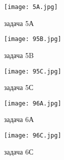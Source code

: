 \documentclass[12pt]{amsart}
\theoremstyle{definition}
\theoremstyle{remark}
\theoremstyle{plain}
\begin{document}
\begin{figure}[h]
\begin{center}
\texttt{[image: 5A.jpg]}
\caption{задача 5А}
\end{center}
\end{figure}


\begin{figure}[h]
\begin{center}
\texttt{[image: 95B.jpg]}
\caption{задача 5B}
\end{center}
\end{figure}


\begin{figure}[h]
\begin{center}
\texttt{[image: 95C.jpg]}
\caption{задача 5С}
\end{center}
\end{figure}


\begin{figure}[h]
\begin{center}
\texttt{[image: 96A.jpg]}
\caption{задача 6А}
\end{center}
\end{figure}


\begin{figure}[h]
\begin{center}
\texttt{[image: 96C.jpg]}
\caption{задача 6С}
\end{center}
\end{figure}
\end{document}
